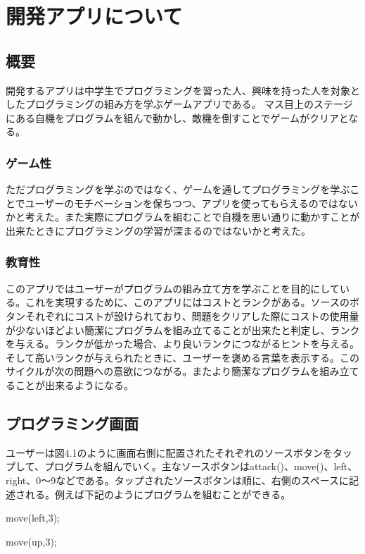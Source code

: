 \documentclass[openany,11pt,papersize]{jsbook}
\begin{document}


\chapter{開発アプリについて}
\section{概要}
開発するアプリは中学生でプログラミングを習った人、興味を持った人を対象としたプログラミングの組み方を学ぶゲームアプリである。
マス目上のステージにある自機をプログラムを組んで動かし、敵機を倒すことでゲームがクリアとなる。

\subsection{ゲーム性}
ただプログラミングを学ぶのではなく、ゲームを通してプログラミングを学ぶことでユーザーのモチベーションを保ちつつ、アプリを使ってもらえるのではないかと考えた。また実際にプログラムを組むことで自機を思い通りに動かすことが出来たときにプログラミングの学習が深まるのではないかと考えた。
 

\subsection{教育性}
このアプリではユーザーがプログラムの組み立て方を学ぶことを目的にしている。これを実現するために、このアプリにはコストとランクがある。ソースのボタンそれぞれにコストが設けられており、問題をクリアした際にコストの使用量が少ないほどよい簡潔にプログラムを組み立てることが出来たと判定し、ランクを与える。ランクが低かった場合、より良いランクにつながるヒントを与える。そして高いランクが与えられたときに、ユーザーを褒める言葉を表示する。このサイクルが次の問題への意欲につながる。またより簡潔なプログラムを組み立てることが出来るようになる。

\section{プログラミング画面}

ユーザーは図4.1のように画面右側に配置されたそれぞれのソースボタンをタップして、プログラムを組んでいく。主なソースボタンはattack()、move()、left、right、0〜9などである。タップされたソースボタンは順に、右側のスペースに記述される。例えば下記のようにプログラムを組むことができる。
\par move(left,3);
\par move(up,3);
\end{document}
